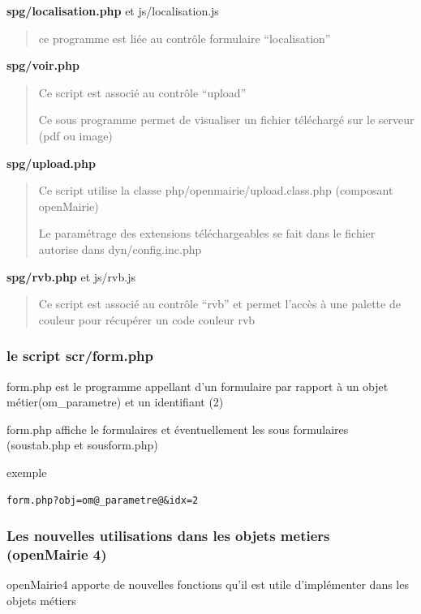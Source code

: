 \documentclass[letterpaper,10pt,french]{manual}
\begin{document}
\textbf{spg/localisation.php} et js/localisation.js
\begin{quote}

ce programme est liée au contrôle formulaire ``localisation''
\end{quote}

\textbf{spg/voir.php}
\begin{quote}

Ce script est associé au contrôle ``upload''

Ce sous programme permet de visualiser un fichier téléchargé
sur le serveur (pdf ou image)
\end{quote}

\textbf{spg/upload.php}
\begin{quote}

Ce script utilise la classe php/openmairie/upload.class.php (composant openMairie)

Le paramétrage des extensions téléchargeables se fait dans le fichier autorise dans dyn/config.inc.php
\end{quote}

\textbf{spg/rvb.php} et js/rvb.js
\begin{quote}

Ce script est associé au contrôle ``rvb'' et permet l'accès à une palette de couleur
pour récupérer un code couleur rvb
\end{quote}


\subsubsection{le script scr/form.php}

form.php est le programme appellant d'un formulaire par rapport à un objet
métier(om\_parametre) et un identifiant (2)

form.php affiche le formulaires et éventuellement les sous formulaires (soustab.php et sousform.php)

exemple

\begin{Verbatim}[commandchars=@\[\]]
form.php?obj=om@_parametre@&idx=2
\end{Verbatim}


\subsubsection{Les nouvelles utilisations dans les objets metiers (openMairie 4)}

openMairie4 apporte de nouvelles fonctions qu'il est utile d'implémenter dans
les objets métiers
\end{document}
